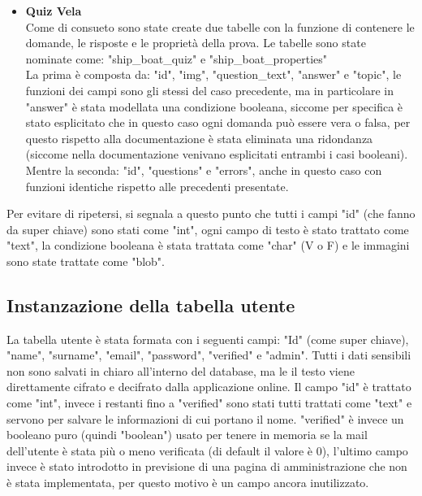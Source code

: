 \begin{itemize}
	\item \textbf{Quiz Vela}\\
	Come di consueto sono state create due tabelle con la funzione di contenere le domande, le risposte e le proprietà della prova. Le tabelle sono state nominate come: "ship\_boat\_quiz" e "ship\_boat\_properties"\\
	La prima è composta da: "id", "img", "question\_text", "answer" e "topic", le funzioni dei campi sono gli stessi del caso precedente, ma in particolare in "answer" è stata modellata una condizione booleana, siccome per specifica è stato esplicitato che in questo caso ogni domanda può essere vera o falsa, per questo rispetto alla documentazione è stata eliminata una ridondanza (siccome nella documentazione venivano esplicitati entrambi i casi booleani). Mentre la seconda: "id", "questions" e "errors", anche in questo caso con funzioni identiche rispetto alle precedenti presentate.  
\end{itemize}

Per evitare di ripetersi, si segnala a questo punto che tutti i campi "id" (che fanno da super chiave) sono stati come "int", ogni campo di testo è stato trattato come "text", la condizione booleana è stata trattata come "char" (V o F) e le immagini sono state trattate come "blob". 

\subsection{Instanzazione della tabella utente}
\raggedright
La tabella utente è stata formata con i seguenti campi: "Id" (come super chiave), "name", "surname", "email", "password", "verified" e "admin". Tutti i dati sensibili non sono salvati in chiaro all'interno del database, ma le il testo viene direttamente cifrato e decifrato dalla applicazione online. Il campo "id" è trattato come "int", invece i restanti fino a "verified" sono stati tutti trattati come "text" e servono per salvare le informazioni di cui portano il nome. "verified" è invece un booleano puro (quindi "boolean") usato per tenere in memoria se la mail dell'utente è stata più o meno verificata (di default il valore è 0), l'ultimo campo invece è stato introdotto in previsione di una pagina di amministrazione che non è stata implementata, per questo motivo è un campo ancora inutilizzato. 